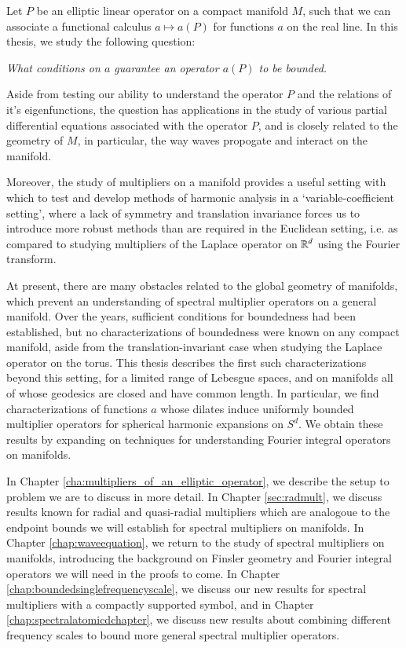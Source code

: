 
Let $P$ be an elliptic linear operator on a compact manifold $M$, such that we can associate a functional calculus $a \mapsto a(P)$ for functions $a$ on the real line. In this thesis, we study the following question:  
%
\begin{changemargin}{2cm}{2cm}
\begin{center}
  \emph{What conditions on $a$ guarantee an operator $a(P)$ to be bounded.}
\end{center}
\end{changemargin}
%
Aside from testing our ability to understand the operator $P$ and the relations of it's eigenfunctions, the question has applications in the study of various partial differential equations associated with the operator $P$, and is closely related to the geometry of $M$, in particular, the way waves propogate and interact on the manifold.

Moreover, the study of multipliers on a manifold provides a useful setting with which to test and develop methods of harmonic analysis in a `variable-coefficient setting', where a lack of symmetry and translation invariance forces us to introduce more robust methods than are required in the Euclidean setting, i.e. as compared to studying multipliers of the Laplace operator on $\operatorname{\mathbb{R}}^d$ using the Fourier transform.

At present, there are many obstacles related to the global geometry of manifolds, which prevent an understanding of spectral multiplier operators on a general manifold. Over the years, sufficient conditions for boundedness had been established, but no characterizations of boundedness were known on any compact manifold, aside from the translation-invariant case when studying the Laplace operator on the torus. This thesis describes the first such characterizations beyond this setting, for a limited range of Lebesgue spaces, and on manifolds all of whose geodesics are closed and have common length. In particular, we find characterizations of functions $a$ whose dilates induce uniformly bounded multiplier operators for spherical harmonic expansions on $S^d$. We obtain these results by expanding on techniques for understanding Fourier integral operators on manifolds.

In Chapter \ref{cha:multipliers_of_an_elliptic_operator}, we describe the setup to problem we are to discuss in more detail. In Chapter \ref{sec:radmult}, we discuss results known for radial and quasi-radial multipliers which are analogoue to the endpoint bounds we will establish for spectral multipliers on manifolds. In Chapter \ref{chap:waveequation}, we return to the study of spectral multipliers on manifolds, introducing the background on Finsler geometry and Fourier integral operators we will need in the proofs to come. In Chapter \ref{chap:boundedsinglefrequencyscale}, we discuss our new results for spectral multipliers with a compactly supported symbol, and in Chapter \ref{chap:spectralatomicdchapter}, we discuss new results about combining different frequency scales to bound more general spectral multiplier operators.